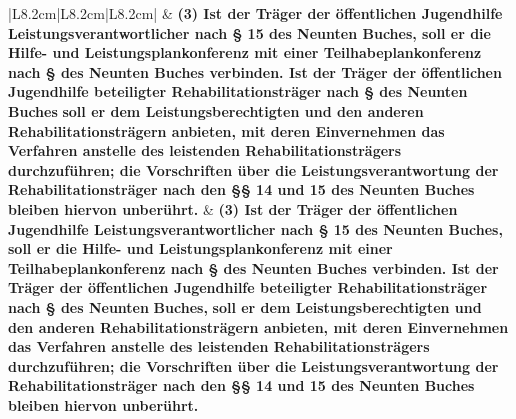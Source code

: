 \documentclass[10pt,a4paper,landscape]{article}
\begin{document}
\begin{longtable}{|L{8.2cm}|L{8.2cm}|L{8.2cm}|}
\hhline{|---|}
 & \textbf{(3) Ist der Träger der öffentlichen  \newline Jugendhilfe Leistungsverantwortlicher  \newline nach \S{} 15 des Neunten Buches, soll er  \newline die Hilfe- und Leistungsplankonferenz  \newline mit einer Teilhabeplankonferenz nach \S{}   des Neunten Buches verbinden. Ist  \newline der Träger der öffentlichen Jugendhilfe  \newline beteiligter Rehabilitationsträger nach \S{}   des Neunten }\textbf{\textcolor{diffred}{Buches}}\textbf{ soll er dem  \newline Leistungsberechtigten und den anderen  \newline Rehabilitationsträgern anbieten, mit  \newline deren Einvernehmen das Verfahren  \newline anstelle des leistenden  \newline Rehabilitationsträgers durchzuführen;  \newline die Vorschriften über die  \newline Leistungsverantwortung der  \newline Rehabilitationsträger nach den \S{}\S{} 14  \newline und 15 des Neunten Buches bleiben  \newline hiervon unberührt. } & \textbf{(3) Ist der Träger der öffentlichen  \newline Jugendhilfe Leistungsverantwortlicher  \newline nach \S{} 15 des Neunten Buches, soll er  \newline die Hilfe- und Leistungsplankonferenz  \newline mit einer Teilhabeplankonferenz nach \S{}   des Neunten Buches verbinden. Ist  \newline der Träger der öffentlichen Jugendhilfe  \newline beteiligter Rehabilitationsträger nach \S{}   des Neunten }\textbf{\textcolor{diffgreen}{Buches,}}\textbf{ soll er dem  \newline Leistungsberechtigten und den anderen  \newline Rehabilitationsträgern anbieten, mit  \newline deren Einvernehmen das Verfahren  \newline anstelle des leistenden  \newline Rehabilitationsträgers durchzuführen;  \newline die Vorschriften über die  \newline Leistungsverantwortung der  \newline Rehabilitationsträger nach den \S{}\S{} 14  \newline und 15 des Neunten Buches bleiben  \newline hiervon unberührt. } \\

\end{longtable}
\end{document}
